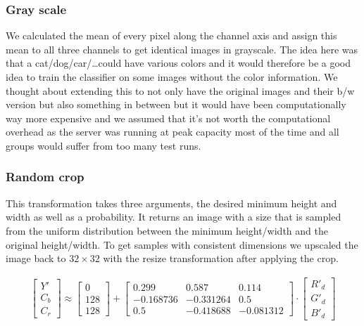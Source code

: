 \subsubsection{Gray scale} We calculated the mean of every pixel along the channel axis and assign this mean to all three channels to get identical images in grayscale. The idea here was that a cat/dog/car/\ldots could have various colors and it would therefore be a good idea to train the classifier on some images without the color information. We thought about extending this to not only have the original images and their b/w version but also something in between but it would have been computationally way more expensive and we assumed that it's not worth the computational overhead as the server was running at peak capacity most of the time and all groups would suffer from too many test runs.
\subsubsection{Random crop} This transformation takes three arguments, the desired minimum height and width as well as a probability. It returns an image with a size that is sampled from the uniform distribution between the minimum height/width and the original height/width. To get samples with consistent dimensions we upscaled the image back to $32\times 32$ with the resize transformation after applying the crop. 


\begin{align}
\left[\begin{array}{c}Y' \\ C_b \\ C_r\end{array}\right]
\approx
\left[\begin{array}{c}0  \\ 128 \\ 128\end{array}\right]
+
\left[\begin{array}{ccc} 0.299 & 0.587 & 0.114\\ -0.168736 & -0.331264 & 0.5  \\ 0.5 & -0.418688 & -0.081312\end{array}\right]
\cdot
\left[\begin{array}{c}R'_d \\ G'_d \\ B'_d\end{array}\right]\label{eq:ycc}
\end{align}

